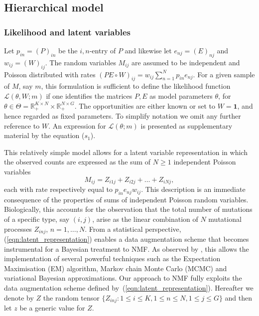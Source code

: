 \documentclass{bioinfo}
\begin{document}
\subsection{Hierarchical model}
\subsubsection{Likelihood and latent variables}
Let $p_{in} = (P)_{in}$ be the $i,n$-entry of $P$ and likewise let
$e_{nj} = (E)_{nj}$ and $w_{ij} = (W)_{ij}$.  The random variables
$M_{ij}$ are assumed to be independent and Poisson distributed with
rates
$
  (PE\circ W)_{ij} = w_{ij}\sum_{n=1}^N p_{in}e_{nj}.
$
For a given sample of $M$, say $m$, this formulation is sufficient to
define the likelihood function $\mathcal L(\theta, W; m)$ if one
identifies the matrices $P, E$ as model parameters $\theta$, for
$\theta \in \Theta = \mathbb R_+^{K\times N}\times \mathbb
R_+^{N\times G}$. The opportunities are either known or set to $W =
\mathbf{1}$, and hence regarded as fixed parameters. To simplify
notation we omit any further reference to $W$. An expression for
$\mathcal L(\theta; m)$ is presented as supplementary material by the
equation ($s_1$).

This relatively simple model allows for a latent variable
representation in which the observed counts are expressed as the sum
of $N\geq 1$ independent Poisson variables
\begin{equation}
  \label{eqn:latent_representation}
   M_{ij} = Z_{i1j} + Z_{i2j} + \ldots + Z_{iNj},
\end{equation}
each with rate respectively equal to $p_{in}e_{nj}w_{ij}$. This
description is an immediate consequence of the properties of sums of
independent Poisson random variables. Biologically, this accounts for
the observation that the total number of mutations of a specific type,
say $(i,j)$, arise as the linear combination of $N$ mutational
processes $Z_{inj}$, $n = 1, \ldots, N$. From a statistical
perspective, (\ref{eqn:latent_representation}) enables a data
augmentation scheme that becomes instrumental for a Bayesian treatment
to NMF. As observed by \cite{C}, this allows the implementation of
several powerful techniques such as the Expectation Maximisation (EM)
algorithm, Markov chain Monte Carlo (MCMC) and variational Bayesian
approximations.  Our approach to NMF fully exploits the data
augmentation scheme defined by~(\ref{eqn:latent_representation}).
Hereafter we denote by $Z$ the random tensor $\{Z_{inj}: 1\leq i\leq
K, 1\leq n \leq N, 1\leq j\leq G\}$ and then let $z$ be a generic
value for $Z$.
\end{document}
